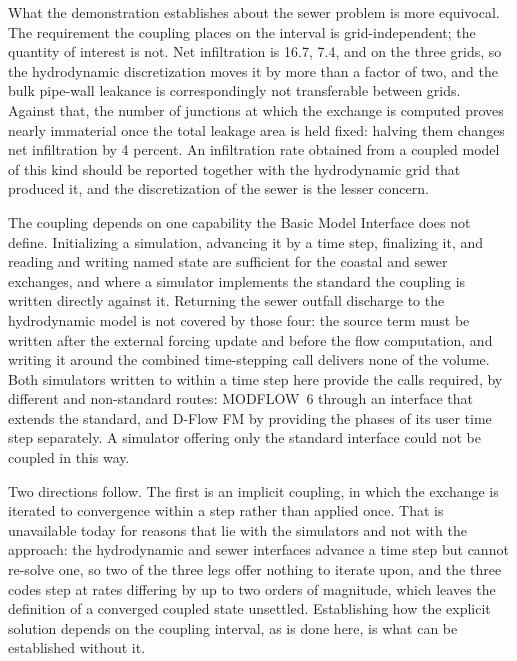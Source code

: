 \documentclass[preprint,authoryear,11pt]{elsarticle}
\begin{document}
What the demonstration establishes about the sewer problem is more equivocal. The requirement the coupling places on the interval is grid-independent; the quantity of interest is not. Net infiltration is 16.7, 7.4, and  on the three grids, so the hydrodynamic discretization moves it by more than a factor of two, and the bulk pipe-wall leakance is correspondingly not transferable between grids. Against that, the number of junctions at which the exchange is computed proves nearly immaterial once the total leakage area is held fixed: halving them changes net infiltration by 4 percent. An infiltration rate obtained from a coupled model of this kind should be reported together with the hydrodynamic grid that produced it, and the discretization of the sewer is the lesser concern.

The coupling depends on one capability the Basic Model Interface does not define. Initializing a simulation, advancing it by a time step, finalizing it, and reading and writing named state are sufficient for the coastal and sewer exchanges, and where a simulator implements the standard the coupling is written directly against it. Returning the sewer outfall discharge to the hydrodynamic model is not covered by those four: the source term must be written after the external forcing update and before the flow computation, and writing it around the combined time-stepping call delivers none of the volume. Both simulators written to within a time step here provide the calls required, by different and non-standard routes: MODFLOW~6 through an interface that extends the standard, and D-Flow FM by providing the phases of its user time step separately. A simulator offering only the standard interface could not be coupled in this way.

Two directions follow. The first is an implicit coupling, in which the exchange is iterated to convergence within a step rather than applied once. That is unavailable today for reasons that lie with the simulators and not with the approach: the hydrodynamic and sewer interfaces advance a time step but cannot re-solve one, so two of the three legs offer nothing to iterate upon, and the three codes step at rates differing by up to two orders of magnitude, which leaves the definition of a converged coupled state unsettled. Establishing how the explicit solution depends on the coupling interval, as is done here, is what can be established without it.
\end{document}

